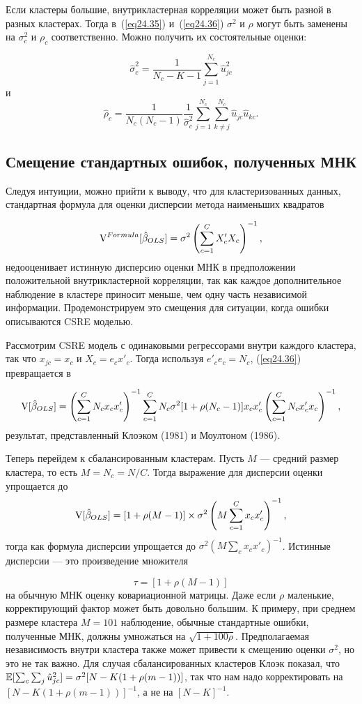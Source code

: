 Если кластеры большие, внутрикластерная корреляции может быть разной в разных кластерах. Тогда в~(\ref{eq24.35}) и~(\ref{eq24.36}) $\sigma^2$ и $\rho$ могут быть заменены на $\sigma^2_c$ и $\rho_c$ соответственно. Можно получить их состоятельные оценки:

$$
\hat \sigma^2_c = \frac{1}{N_c-K-1}\sum_{j=1}^{N_c} \hat u^2_{jc}
$$
и
$$
\hat \rho_c = \frac{1}{N_c (N_c -1)} \frac{1}{\hat \sigma^2_c} \sum_{j=1}^{N_c} \sum_{k \ne j}^{N_c} \hat u_{jc} \hat u_{kc}.
$$

\subsection*{Смещение стандартных ошибок, полученных МНК}

Следуя интуиции, можно прийти к выводу, что для кластеризованных данных, стандартная формула для оценки дисперсии метода наименьших квадратов

$$
\mathrm{V}^{Formula}[\hat \beta_{OLS}] = \sigma^2 \left( \sum_{c=1}^C X'_c X_c \right)^{-1},
$$
недооценивает истинную дисперсию оценки МНК в предположении положительной внутрикластерной корреляции, так как каждое дополнительное наблюдение в кластере приносит меньше, чем одну часть независимой информации. Продемонстрируем это смещения для ситуации, когда ошибки описываются CSRE моделью. 

Рассмотрим CSRE модель с одинаковыми регрессорами внутри каждого кластера, так что $x_{jc} = x_c$ и $X_c = e_c x'_c$. Тогда используя $e'_c e_c = N_c$, (\ref{eq24.36}) превращается в

$$
\mathrm{V}[\hat \beta_{OLS}] = \left( \sum_{c=1}^C N_c x_c x'_c \right)^{-1} \sum_{c=1}^C N_c \sigma^2 [1+ \rho(N_c -1)] x_c x'_c \left( \sum_{c=1}^C N_c x'_c x_c \right)^{-1},
$$
результат, представленный Клоэком (1981) и Моултоном (1986).

Теперь перейдем к сбалансированным кластерам. Пусть $M$ --- средний размер кластера, то есть $M = N_c = N/C$. Тогда выражение для дисперсии оценки упрощается до
$$
\mathrm{V}[\hat{\beta}_{OLS}] = [1+\rho (M-1)] \times \sigma^2 \left( M \sum_{c=1}^C x_c x_c'  \right)^{-1},
$$
тогда как формула дисперсии упрощается до $\sigma^2 (M \sum_c x_c x'_c)^{-1}$. Истинные дисперсии --- это произведение множителя

$$
\tau = [1+\rho (M-1)]
$$
на обычную МНК оценку ковариационной матрицы. Даже если $\rho$ маленькие, корректирующий фактор может быть довольно большим. К примеру, при среднем размере кластера $M = 101$ наблюдение, обычные стандартные ошибки, полученные МНК, должны умножаться на $\sqrt{1+100\rho}$. Предполагаемая независимость внутри кластера также может привести к смещению оценки $\sigma^2$, но это не так важно. Для случая сбалансированных кластеров Клоэк показал, что $\mathbb{E}[\sum_c \sum_j \hat u^2_{jc}] = \sigma^2 [N - K(1+\rho(m-1))]$, так что нам надо корректировать на $[N - K(1+\rho(m-1))]^{-1}$, а не на $[N-K]^{-1}$. 

